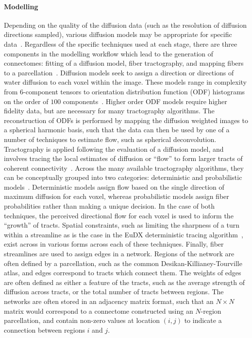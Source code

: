 \paragraph*{Modelling}
Depending on the quality of the diffusion data (such as the resolution of diffusion directions sampled), various
diffusion models may be appropriate for specific
data~\cite{jeurissen2019diffusion,tournier2011diffusion,mori2013introduction}. Regardless of the specific techniques
used at each stage, there are three components in the modelling workflow which lead to the generation of connectomes:
fitting of a diffusion model, fiber tractography, and mapping fibers to a
parcellation~\cite{roncal2013migraine,sporns2005human,Kiar2018-jt,Glasser2013-vf}. Diffusion models seek to assign a
direction or directions of water diffusion to each voxel within the image. These models range in complexity from
$6$-component tensors to orientation distribution function (ODF) histograms on the order of $100$
components~\cite{tournier2011diffusion}. Higher order ODF models require higher fidelity data, but are necessary for
many tractography algorithms. The reconstruction of ODFs is performed by mapping the diffusion weighted images to a
spherical harmonic basis, such that the data can then be used by one of a number of techniques to estimate flow, such
as spherical deconvolution. Tractography is applied following the evaluation of a diffusion model, and involves
tracing the local estimates of diffusion or ``flow'' to form larger tracts of coherent connectivity~\cite{behrens2014mr}.
Across the many available tractography algorithms, they can be conceptually grouped into two categories: deterministic
and probabilistic models~\cite{jeurissen2019diffusion}. Deterministic models assign flow based on the single direction of
maximum diffusion for each voxel, whereas probabilistic models assign fiber probabilities rather than making a unique
decision. In the case of both techniques, the perceived directional flow for each voxel is used to inform the ``growth''
of tracts. Spatial constraints, such as limiting the sharpness of a turn within a streamline as is the case in the EuDX
deterministic tracing algorithm~\cite{garyfallidis2014dipy}, exist across in various forms across each of these techniques.
Finally, fiber streamlines are used to assign edges in a network. Regions of the network are often defined by a
parcellation, such as the common Desikan-Killianey-Tourville~\cite{Klein2012-vi} atlas, and edges correspond to tracts
which connect them. The weights of edges are often defined as either a feature of the tracts, such as the average
strength of diffusion across tracts, or the total number of tracts between regions. The networks are often stored in an
adjacency matrix format, such that an $N \times N$ matrix would correspond to a connectome constructed using an
$N$-region parcellation, and contain non-zero values at location $(i,j)$ to indicate a connection between regions $i$ and
$j$.

